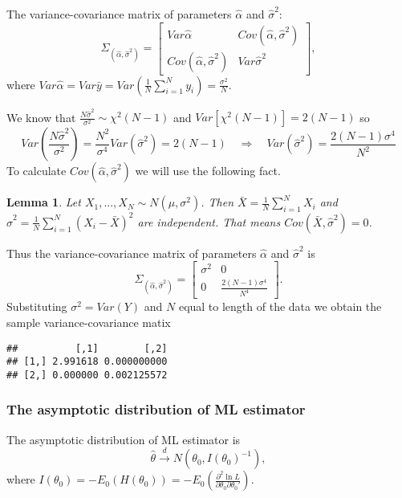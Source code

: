 \documentclass[12pt, a4paper]{article}\usepackage[]{graphicx}\usepackage[]{color}
\makeatletter
\newenvironment{kframe}{%
 \def\at@end@of@kframe{}%
 \ifinner\ifhmode%
  \def\at@end@of@kframe{\end{minipage}}%
  \begin{minipage}{\columnwidth}%
 \fi\fi%
 \def\FrameCommand##1{\hskip\@totalleftmargin \hskip-\fboxsep
 \colorbox{shadecolor}{##1}\hskip-\fboxsep
     \hskip-\linewidth \hskip-\@totalleftmargin \hskip\columnwidth}%
 \MakeFramed {\advance\hsize-\width
   \@totalleftmargin\z@ \linewidth\hsize
   \@setminipage}}%
 {\par\unskip\endMakeFramed%
 \at@end@of@kframe}
\newenvironment{knitrout}{}{} %
\newtheorem{lemma}{Lemma}
\makeatother
\begin{document}
The variance-covariance matrix of parameters $\hat{\alpha}$ and $\hat{\sigma}^{2}$:
\[
  \Sigma_{(\hat{\alpha},\hat{\sigma}^{2})}=
  \begin{bmatrix}  
    Var\hat{\alpha} & Cov(\hat{\alpha},\hat{\sigma}^{2})\\
    Cov(\hat{\alpha},\hat{\sigma}^{2}) & Var\hat{\sigma}^{2}
  \end{bmatrix},
\]
where $ Var\hat{\alpha}=Var\bar{y}=Var\left(\frac{1}{N}\sum^{N}_{i=1}y_{i}\right)=\frac{\sigma^{2}}{N} $.

We know that $\frac{N\hat{\sigma}^{2}}{\sigma^{2}}\sim\chi^{2}(N-1)$ and $Var[\chi^{2}(N-1)]=2(N-1)$ so
\[
Var\left(\frac{N\hat{\sigma}^{2}}{\sigma^{2}}\right)=\frac{N^2}{\sigma^{4}}Var(\hat{\sigma}^{2})=2(N-1)
\quad \Rightarrow \quad
Var(\hat{\sigma}^{2})=\frac{2(N-1)\sigma^{4}}{N^{2}}
\]
To calculate $Cov(\hat{\alpha},\hat{\sigma}^{2})$ we will use the following fact.
%
\begin{lemma}
Let $X_{1},...,X_{N}\sim N(\mu,\sigma^{2})$.
Then $\bar{X}=\frac{1}{N}\sum_{i=1}^{N}X_{i}$ and $\hat{\sigma}^{2}=\frac{1}{N}\sum_{i=1}^{N}(X_i-\bar{X})^{2}$ are independent. 
That means $Cov(\bar{X},\hat{\sigma}^{2})=0$.
\end{lemma}
%
Thus the variance-covariance matrix of parameters $\hat{\alpha}$ and $\hat{\sigma}^{2}$ is
\[
  \Sigma_{(\hat{\alpha},\hat{\sigma}^{2})}=
  \begin{bmatrix}  
    \sigma^{2} & 0\\
    0 & \frac{2(N-1)\sigma^{4}}{N^{4}}
  \end{bmatrix}.
\]
Substituting $\sigma^2 = Var(Y)$ and $N$ equal to length of the data we obtain the sample variance-covariance matix 
\begin{knitrout}
\color{fgcolor}\begin{kframe}
\begin{verbatim}
##          [,1]        [,2]
## [1,] 2.991618 0.000000000
## [2,] 0.000000 0.002125572
\end{verbatim}
\end{kframe}
\end{knitrout}



\subsubsection{The asymptotic distribution of ML estimator}

The asymptotic distribution of ML estimator is
\[\hat{\theta}\xrightarrow[]{d}N(\theta_0, I(\theta_0)^{-1}),\]
where $I(\theta_{0}) = -E_0(H(\theta_{0})) = -E_0\left(\frac{\partial^{2}\ln{L}}{\partial\theta_{0}\partial\theta_{0}'}\right)$.
\end{document}
